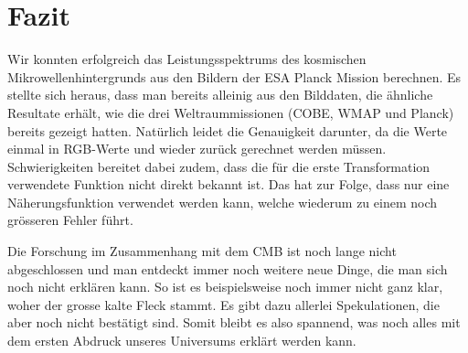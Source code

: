 \section{Fazit}

Wir konnten erfolgreich das Leistungsspektrums des kosmischen 
Mikrowellenhintergrunds aus den Bildern der ESA Planck Mission berechnen. Es 
stellte sich heraus, dass man bereits alleinig aus den Bilddaten, die ähnliche 
Resultate erhält, wie die drei Weltraummissionen (COBE, WMAP und Planck) 
bereits gezeigt hatten. Natürlich leidet die Genauigkeit darunter, da die Werte 
einmal in RGB-Werte und wieder zurück gerechnet werden müssen. Schwierigkeiten 
bereitet dabei zudem, dass die für die erste Transformation verwendete Funktion 
nicht direkt bekannt ist. Das hat zur Folge, dass nur eine Näherungsfunktion 
verwendet werden kann, welche wiederum zu einem noch grösseren Fehler führt.

Die Forschung im Zusammenhang mit dem CMB ist noch lange nicht abgeschlossen 
und man entdeckt immer noch weitere neue Dinge, die man sich noch nicht 
erklären kann. So ist es beispielsweise noch immer nicht ganz klar, woher der 
grosse kalte Fleck stammt. Es gibt dazu allerlei Spekulationen, die aber 
noch nicht bestätigt sind. Somit bleibt es also spannend, was noch alles mit 
dem ersten Abdruck unseres Universums erklärt werden kann.
